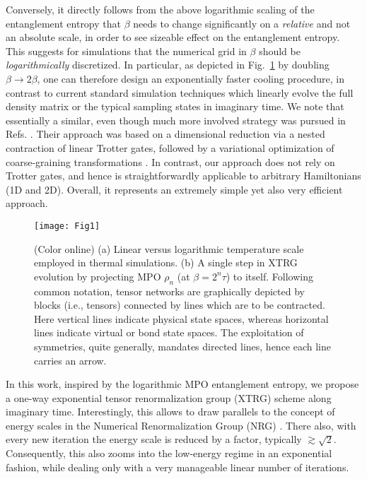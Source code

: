 \documentclass[aps,prx,twocolumn,showpacs,psfig,superscriptaddress,longbibliography]{revtex4-1}
\newcommand{\Fig}[1]{Fig.~\ref{#1}}
\begin{document}
Conversely, it directly follows from the above logarithmic scaling
of the entanglement entropy that $\beta$ needs to change
significantly on a {\it relative} and not an absolute scale, in
order to see sizeable effect on the entanglement entropy. This
suggests for simulations that the numerical grid in $\beta$ should
be {\it logarithmically} discretized. In particular, as depicted in
\Fig{Fig:Diagram} by doubling $\beta \to 2\beta$, one can therefore
design an exponentially faster cooling procedure, in contrast to
current standard simulation techniques which linearly evolve the
full density matrix \cite{Bursill.r.j+:1996:DMRG,Wang.x+:1997:TMRG,
Xiang.t:1998:Thermodynamics,Feiguin.a.e+:2005:ftDMRG,Li.w+:2011:LTRG,
Ran.s+:2012:Super-orthogonalization,Dong.y+:2017:BiLTRG} or the
typical sampling states
\cite{White.s.r:2009:METTS,Stoudemire.e.m+:2010:METTS,
Bruognolo.b+:2017:MPS} in imaginary time.
%
We note that essentially a similar, even though much more involved
strategy was pursued in Refs.
.  Their
approach was based on a dimensional reduction via a nested
contraction of linear Trotter gates, followed by a variational
optimization of coarse-graining transformations
\cite{Levin.m+:2007:TRG}.  In contrast, our approach does not rely
on Trotter gates, and hence is straightforwardly applicable to
arbitrary Hamiltonians (1D and 2D). Overall, it represents an
extremely simple yet also very efficient approach.


\begin{figure}[tbp]
\texttt{[image: Fig1]}
\caption{(Color online)
(a) Linear versus logarithmic temperature scale employed in
   thermal simulations.
(b) A single step in XTRG evolution by
   projecting MPO $\rho_n$ (at $\beta=2^n \tau$) to itself.
   Following common notation, tensor networks are graphically
   depicted by blocks (i.e., tensors) connected by lines which are
   to be contracted.  Here vertical lines indicate physical state
   spaces, whereas horizontal lines indicate virtual or bond state
   spaces.  The exploitation of symmetries, quite generally,
   mandates directed lines, hence each line carries an arrow.
}
\label{Fig:Diagram}
\end{figure}


In this work, inspired by the logarithmic MPO entanglement entropy,
we propose a one-way exponential tensor renormalization group (XTRG)
scheme along imaginary time.  Interestingly, this allows to draw
parallels to the concept of energy scales in the Numerical
Renormalization Group (NRG) \cite{Wilson75,Bulla08, Wb12_FDM}. There
also, with every new iteration the energy scale is reduced by a
factor, typically $\gtrsim \sqrt{2}$. Consequently, this also zooms
into the low-energy regime in an exponential fashion, while dealing
only with a very manageable linear number of iterations.
\end{document}
